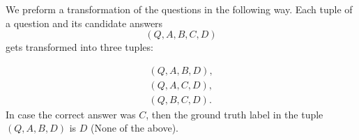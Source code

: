 We preform a transformation of the questions in the following way. Each tuple of a question and 
its candidate answers
$$
    (Q,A,B,C,D)
$$
gets transformed into three tuples:

\begin{align*}
       (Q,A,B,D), \\
       (Q,A,C,D), \\
       (Q,B,C,D).
\end{align*}
In case the correct answer was
$C$, then the ground truth label in the tuple $(Q,A,B,D)$ is $D$  (None of the above).
